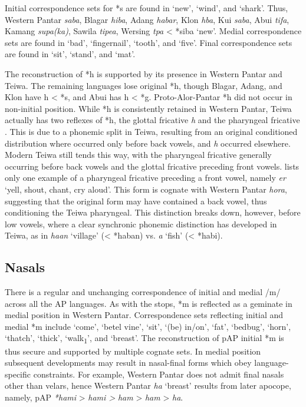Initial correspondence sets for *s are found in `new', `wind', and `shark'. Thus, Western Pantar \textit{sab{\textlengthmark}a}, Blagar \textit{ hiba}, Adang \textit{habar}, Klon \textit{h{\textschwa}ba}, Kui \textit{saba}, Abui \textit{tifa}, Kamang \textit{supa(ka)}, Sawila \textit{tipea}, Wersing \textit{t{\textschwa}pa }{\textless} *siba `new'. Medial correspondence sets are found in `bad', `fingernail', `tooth', and `five'. Final correspondence sets are found in `sit', `stand', and `mat'. 

The reconstruction of *h is supported by its presence in Western Pantar and Teiwa. The remaining languages lose original *h, though Blagar, Adang, and Klon have h {\textless} *s, and Abui has h {\textless} *g. Proto-Alor-Pantar *h did not occur in non-initial position. While *h is consistently retained in Western Pantar, Teiwa actually has two reflexes of *h, the glottal fricative \textit{h} and the pharyngeal fricative \textit{{\pharfric}}. This is due to a phonemic split in Teiwa, resulting from an original conditioned distribution where \textit{{\pharfric}} occurred only before back vowels, and \textit{h} occurred elsewhere. Modern Teiwa still tends this way, with the pharyngeal fricative generally occurring before back vowels and the glottal fricative preceding front vowels. \citet{Klamer2010} lists only one example of a pharyngeal fricative preceding a front vowel, namely \textit{{\pharfric}er} `yell, shout, chant, cry aloud'. This form is cognate with Western Pantar \textit{hora{\ng}}, suggesting that the original 
form may have contained a back vowel, thus conditioning the Teiwa pharyngeal. This distinction breaks down, however, before low vowels, where a clear synchronic phonemic distinction has developed in Teiwa, as in \textit{ha{\textphi}an }`village' ({\textless} *haban) vs. \textit{{\pharfric}a{\textphi} }`fish' ({\textless} *habi). 

\subsection{ Nasals}
There is a regular and unchanging correspondence of initial and medial /m/ across all the AP languages. As with the stops, *m is reflected as a geminate in medial position in Western Pantar. Correspondence sets reflecting initial and medial *m include `come', `betel vine', `sit', `(be) in/on', `fat', `bedbug', `horn', `thatch', `thick', `walk\textsubscript{1}', and `breast'. The reconstruction of pAP initial *m is thus secure and supported by multiple cognate sets. In medial position subsequent developments may result in nasal-final forms which obey language-specific constraints. For example, Western Pantar does not admit final nasals other than velars, hence Western Pantar \textit{ha{\ng} }`breast' results from later apocope, namely, pAP \textit{*hami} {\textgreater} \textit{ham{\textlengthmark}i {\textgreater}} \textit{ham{\textlengthmark}} {\textgreater} \textit{ham} {\textgreater} \textit{ha}\textit{{\ng}}.

